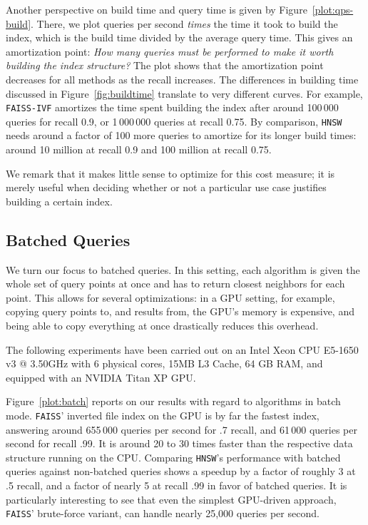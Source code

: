 




Another perspective on build time and query time is given by Figure~\ref{plot:qps-build}. There, we plot queries per second \emph{times} the time it took to build the index, which is the build time divided by the average query time. This gives an amortization point: \emph{How many queries must be performed to make it worth building the index structure?}
The plot shows that the amortization point decreases for all methods as the recall increases. The differences in building time discussed in Figure~\ref{fig:buildtime} translate to very different curves.
For example, \texttt{FAISS-IVF} amortizes the time spent building the index after around 100\,000 queries for recall 0.9, or 1\,000\,000 queries at recall 0.75. By comparison, \texttt{HNSW} needs around a factor of 100 more queries to amortize for its longer build times: around 10 million at recall 0.9 and 100 million at recall 0.75.

We remark that it makes little sense to optimize for this cost measure; it is merely useful when deciding whether or not a particular use case justifies building a certain index. 

\subsection{Batched Queries}

We turn our focus to batched queries. In this setting, each algorithm is given the whole set of query points at once and has to return closest neighbors for each point. This allows for several optimizations: in a GPU setting, for example, copying query points to, and results from, the GPU's memory is expensive, and being able to copy everything at once drastically reduces this overhead.

The following experiments have been carried out on an Intel Xeon CPU E5-1650 v3 @ 3.50GHz with 6 physical cores, 15MB L3 Cache, 64 GB RAM, and equipped with an NVIDIA Titan XP GPU. 

\begin{figure}

\end{figure}

Figure~\ref{plot:batch} reports on our results with regard to algorithms in batch mode. \texttt{FAISS}' inverted file index on the GPU is by far the fastest index, answering around 655\,000 queries per second for .7 recall, and 61\,000 queries per second for recall .99. It is around 20 to 30 times faster than the respective data structure running on the CPU. Comparing \texttt{HNSW}'s performance with batched queries against non-batched queries shows a speedup by a factor of roughly 3 at .5 recall, and a factor of nearly
5 at recall .99 in favor of batched queries.
It is particularly interesting to see that even the simplest GPU-driven approach, \texttt{FAISS}' brute-force variant, can handle nearly 25,000 queries per second.

